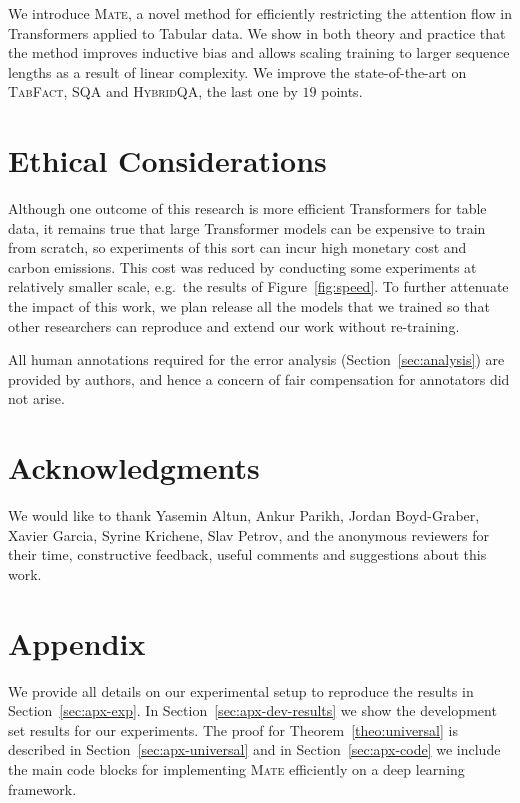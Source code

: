\documentclass[11pt]{article}
\newcommand\sqa{\textsc{SQA}\xspace}
\newcommand\tabfact{\textsc{TabFact}\xspace}
\newcommand\hqa{\textsc{HybridQA}\xspace}
\newcommand{\model}{\textsc{Mate}\xspace}
\begin{document}
We introduce \model, a novel method for efficiently restricting the attention flow in Transformers applied to Tabular data.
We show in both theory and practice that the method improves inductive bias and
allows scaling training to larger sequence lengths as a result of linear complexity.
We improve the state-of-the-art on \tabfact, \sqa and \hqa, the last one by $19$ points.

\section*{Ethical Considerations}

Although one outcome of this research is more efficient Transformers for table data, it remains true that large Transformer models can be expensive to train from scratch, so experiments of this sort can incur high monetary cost and carbon emissions. This cost was reduced by conducting some experiments at relatively smaller scale, e.g.~the results of Figure~\ref{fig:speed}.  To further attenuate the impact of this work, we plan release all the models that we trained so that other researchers can reproduce and extend our work without re-training.

All human annotations required for the error analysis (Section~\ref{sec:analysis}) are provided by authors, and hence a concern of fair compensation for annotators did not arise.

\section*{Acknowledgments}
We would like to thank Yasemin Altun, Ankur Parikh, Jordan Boyd-Graber, Xavier Garcia, Syrine Krichene, Slav Petrov, and
the anonymous reviewers for their time, constructive
feedback, useful comments and suggestions about this work.  




\clearpage

\appendix\section*{Appendix}

We provide all details on our experimental setup to reproduce the results in Section~\ref{sec:apx-exp}.
In Section~\ref{sec:apx-dev-results} we show the development set results for our experiments. 
The proof for Theorem~\ref{theo:universal} is described in Section~\ref{sec:apx-universal} and in Section~\ref{sec:apx-code} we include the main code blocks for implementing \model efficiently on a deep learning framework.
\end{document}
